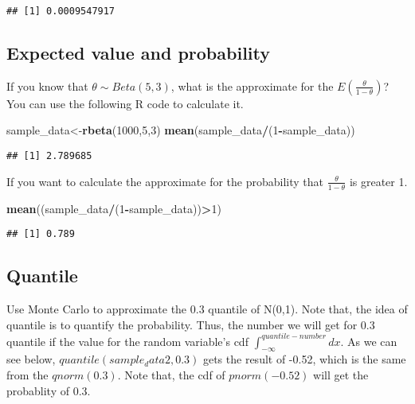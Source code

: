 \documentclass[]{book}
\newenvironment{Shaded}{\begin{snugshade}}{\end{snugshade}}
\newcommand{\KeywordTok}[1]{\textcolor[rgb]{0.13,0.29,0.53}{\textbf{#1}}}
\newcommand{\DecValTok}[1]{\textcolor[rgb]{0.00,0.00,0.81}{#1}}
\newcommand{\OperatorTok}[1]{\textcolor[rgb]{0.81,0.36,0.00}{\textbf{#1}}}
\newcommand{\NormalTok}[1]{#1}
\begin{document}
\begin{verbatim}
## [1] 0.0009547917
\end{verbatim}

\subsection{Expected value and
probability}\label{expected-value-and-probability}

If you know that \(\theta \sim Beta(5,3)\), what is the approximate for
the \(E(\frac{\theta}{1-\theta})\)? You can use the following R code to
calculate it.

\begin{Shaded}
\begin{Highlighting}[]
\NormalTok{sample_data<-}\KeywordTok{rbeta}\NormalTok{(}\DecValTok{1000}\NormalTok{,}\DecValTok{5}\NormalTok{,}\DecValTok{3}\NormalTok{)}
\KeywordTok{mean}\NormalTok{(sample_data}\OperatorTok{/}\NormalTok{(}\DecValTok{1}\OperatorTok{-}\NormalTok{sample_data))}
\end{Highlighting}
\end{Shaded}

\begin{verbatim}
## [1] 2.789685
\end{verbatim}

If you want to calculate the approximate for the probability that
\(\frac{\theta}{1-\theta}\) is greater 1.

\begin{Shaded}
\begin{Highlighting}[]
\KeywordTok{mean}\NormalTok{((sample_data}\OperatorTok{/}\NormalTok{(}\DecValTok{1}\OperatorTok{-}\NormalTok{sample_data))}\OperatorTok{>}\DecValTok{1}\NormalTok{)}
\end{Highlighting}
\end{Shaded}

\begin{verbatim}
## [1] 0.789
\end{verbatim}

\subsection{Quantile}\label{quantile}

Use Monte Carlo to approximate the 0.3 quantile of N(0,1). Note that,
the idea of quantile is to quantify the probability. Thus, the number we
will get for 0.3 quantile if the value for the random variable's cdf
\(\int_{-\infty}^{quantile-number}dx\). As we can see below,
\(quantile(sample_data2,0.3)\) gets the result of -0.52, which is the
same from the \(qnorm(0.3)\). Note that, the cdf of \(pnorm(-0.52)\)
will get the probablity of \(0.3\).
\end{document}
